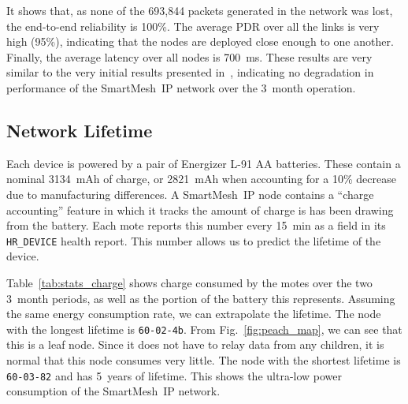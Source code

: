 \documentclass{elsarticle}
\newcommand{\smip}                {SmartMesh~IP\xspace}
\newcommand{\HRDEVICE}            {{\tt HR\_DEVICE}\xspace}
\newcommand{\PEACHNUMPCKTS}       {693,844\xspace}
\begin{document}
It shows that, as none of the \PEACHNUMPCKTS packets generated in the network was lost, the end-to-end reliability is 100\%.
The average PDR over all the links is very high (95\%), indicating that the nodes are deployed close enough to one another.
Finally, the average latency over all nodes is 700~ms.
These results are very similar to the very initial results presented in~\cite{watteyne16peach}, indicating no degradation in performance of the \smip network over the 3~month operation.

\subsection{Network Lifetime}
\label{sec:lifetime}


Each device is powered by a pair of Energizer L-91 AA batteries.
These contain a nominal 3134~mAh of charge, or 2821~mAh when accounting for a 10\% decrease due to manufacturing differences.
A \smip node contains a ``charge accounting'' feature in which it tracks the amount of charge is has been drawing from the battery.
Each mote reports this number every 15~min as a field in its \HRDEVICE health report.
This number allows us to predict the lifetime of the device.


Table~\ref{tab:stats_charge} shows charge consumed by the motes over the two 3~month periods, as well as the portion of the battery this represents.
Assuming the same energy consumption rate, we can extrapolate the lifetime.
The node with the longest lifetime is {\tt 60-02-4b}.
From Fig.~\ref{fig:peach_map}, we can see that this is a leaf node.
Since it does not have to relay data from any children, it is normal that this node consumes very little.
The node with the shortest lifetime is {\tt 60-03-82} and has 5~years of lifetime.
This shows the ultra-low power consumption of the \smip network.
\end{document}
